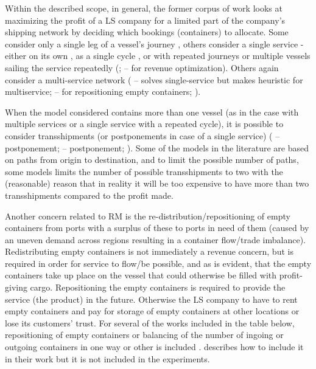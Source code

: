 Within the described scope, in general, the former corpus of work looks at maximizing the profit of a LS company for a limited part of the company’s shipping network by deciding which bookings (containers) to allocate. Some consider only a single leg of a vessel’s journey \citep{Lee07,Bingzhou08}, others consider a single service - either on its own \citep{Maragos94,Ting04}, as a single cycle \citep{Feng08,Feng07,Wang19a}, or with repeated journeys or multiple vessels sailing the service repeatedly (\citealp{Zou08,Lu10}; \citealp{Chang15} -- for revenue optimization). Others again consider a multi-service network (\citealp{Zurheide15, Demirag07} -- solves single-service but makes heuristic for multiservice; \citealp{Xianzhi07, Zurheide12, Wang15b, Chang15} -- for repositioning empty containers; \citealp{Song12}).

When the model considered contains more than one vessel (as in the case with multiple services or a single service with a repeated cycle), it is possible to consider transshipments (or postponements in case of a single service) (\citealp{Lee07} -- postponement; \citealp{Zurheide15,Zhen17,Wang19b} -- postponement; \citealp{Xianzhi07, Zurheide12, Wang15b, Song12}). Some of the models in the literature are based on paths from origin to destination, and to limit the possible number of paths, some models limits the number of possible transshipments to two \citep{Zurheide12, Zurheide15, Song12} with the (reasonable) reason that in reality it will be too expensive to have more than two transshipments compared to the profit made.

Another concern related to RM is the re-distribution/repositioning of empty containers from ports with a surplus of these to ports in need of them (caused by an uneven demand across regions resulting in a container flow/trade imbalance). Redistributing empty containers is not immediately a revenue concern, but is required in order for service to flow/be possible, and as is evident, that the empty containers take up place on the vessel that could otherwise be filled with profit-giving cargo. Repositioning the empty containers is required to provide the service (the product) in the future. Otherwise the LS company to have to rent empty containers and pay for storage of empty containers at other locations or lose its customers’ trust. For several of the works included in the table below, repositioning of empty containers or balancing of the number of ingoing or outgoing containers in one way or other is included \citep{Zurheide15, Ting04, Xianzhi07, Zou08, Zurheide12, Lu10, Chang15, Song12}. \citet{Wang15b} describes how to include it in their work but it is not included in the experiments.

